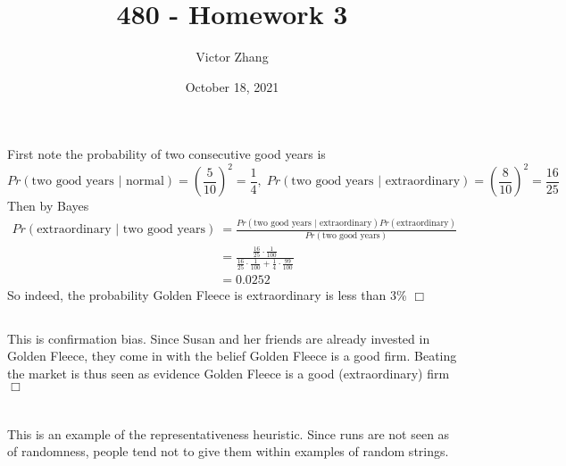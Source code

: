 \documentclass{article}
\title{480 - Homework 3}
\author{Victor Zhang}
\date{October 18, 2021}
\begin{document}
\maketitle

\section{}
\subsection{}
First note the probability of two consecutive good years is
$$Pr(\text{two good years } | \text{ normal}) = \left(\frac{5}{10}\right)^2 = \frac{1}{4},\; Pr(\text{two good years } | \text{ extraordinary}) = \left(\frac{8}{10}\right)^2 = \frac{16}{25}$$
Then by Bayes
\begin{equation*}
\begin{split}
Pr(\text{extraordinary } | \text{ two good years}) &= \frac{Pr(\text{two good years } | \text{ extraordinary}) Pr(\text{extraordinary})}{Pr(\text{two good years})}\\
&= \frac{\frac{16}{25} \cdot \frac{1}{100}}{\frac{16}{25} \cdot \frac{1}{100} + \frac{1}{4} \cdot \frac{99}{100}}\\
&= 0.0252
\end{split}
\end{equation*}
So indeed, the probability Golden Fleece is extraordinary is less than 3\% $\Box$

\subsection{}
This is confirmation bias. Since Susan and her friends are already invested in Golden Fleece, they come in with the belief Golden Fleece is a good firm. Beating the market is thus seen as evidence Golden Fleece is a good (extraordinary) firm $\Box$

\section{}
This is an example of the representativeness heuristic. Since runs are not seen as  of randomness, people tend not to give them within examples of random strings.
\end{document}
